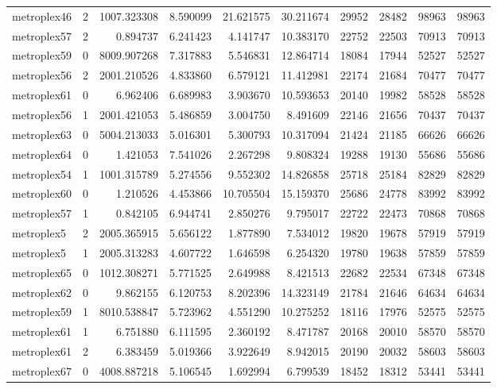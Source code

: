\begin{longtable}{|l|r|r|r|r|r|r|r|r|r|}
metroplex46 & 2 & 1007.323308 & 8.590099 & 21.621575 & 30.211674 & 29952 & 28482 & 98963 & 98963 \\
metroplex57 & 2 & 0.894737 & 6.241423 & 4.141747 & 10.383170 & 22752 & 22503 & 70913 & 70913 \\
metroplex59 & 0 & 8009.907268 & 7.317883 & 5.546831 & 12.864714 & 18084 & 17944 & 52527 & 52527 \\
metroplex56 & 2 & 2001.210526 & 4.833860 & 6.579121 & 11.412981 & 22174 & 21684 & 70477 & 70477 \\
metroplex61 & 0 & 6.962406 & 6.689983 & 3.903670 & 10.593653 & 20140 & 19982 & 58528 & 58528 \\
metroplex56 & 1 & 2001.421053 & 5.486859 & 3.004750 & 8.491609 & 22146 & 21656 & 70437 & 70437 \\
metroplex63 & 0 & 5004.213033 & 5.016301 & 5.300793 & 10.317094 & 21424 & 21185 & 66626 & 66626 \\
metroplex64 & 0 & 1.421053 & 7.541026 & 2.267298 & 9.808324 & 19288 & 19130 & 55686 & 55686 \\
metroplex54 & 1 & 1001.315789 & 5.274556 & 9.552302 & 14.826858 & 25718 & 25184 & 82829 & 82829 \\
metroplex60 & 0 & 1.210526 & 4.453866 & 10.705504 & 15.159370 & 25686 & 24778 & 83992 & 83992 \\
metroplex57 & 1 & 0.842105 & 6.944741 & 2.850276 & 9.795017 & 22722 & 22473 & 70868 & 70868 \\
metroplex5 & 2 & 2005.365915 & 5.656122 & 1.877890 & 7.534012 & 19820 & 19678 & 57919 & 57919 \\
metroplex5 & 1 & 2005.313283 & 4.607722 & 1.646598 & 6.254320 & 19780 & 19638 & 57859 & 57859 \\
metroplex65 & 0 & 1012.308271 & 5.771525 & 2.649988 & 8.421513 & 22682 & 22534 & 67348 & 67348 \\
metroplex62 & 0 & 9.862155 & 6.120753 & 8.202396 & 14.323149 & 21784 & 21646 & 64634 & 64634 \\
metroplex59 & 1 & 8010.538847 & 5.723962 & 4.551290 & 10.275252 & 18116 & 17976 & 52575 & 52575 \\
metroplex61 & 1 & 6.751880 & 6.111595 & 2.360192 & 8.471787 & 20168 & 20010 & 58570 & 58570 \\
metroplex61 & 2 & 6.383459 & 5.019366 & 3.922649 & 8.942015 & 20190 & 20032 & 58603 & 58603 \\
metroplex67 & 0 & 4008.887218 & 5.106545 & 1.692994 & 6.799539 & 18452 & 18312 & 53441 & 53441 \\

\end{longtable}
